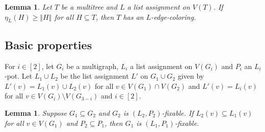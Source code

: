 \documentclass[12pt]{article}
\theoremstyle{plain}
\newtheorem{lem}[thm]{Lemma}
\theoremstyle{definition}
\theoremstyle{remark}
\newcommand{\size}[1]{\left\Vert#1\right\Vert}
\newcommand{\irange}[1]{\left[#1\right]}
\begin{document}
\begin{lem}\label{MultiTreeHall}
Let $T$ be a multitree and $L$ a list assignment on $V(T)$.  If $\eta_L(H) \ge \size{H}$ for all $H \subseteq T$, then $T$ has an $L$-edge-coloring.
\end{lem}

\subsection{Basic properties}
For $i \in \irange{2}$, let $G_i$ be a multigraph, $L_i$ a list assignment on $V(G_i)$ and $P_i$ an $L_i$-pot.  Let $L_1 \cup L_2$ be the list assignment $L'$ on $G_1 \cup G_2$ given by $L'(v) = L_1(v) \cup L_2(v)$ for all $v \in V(G_1) \cap V(G_2)$ and $L'(v) = L_i(v)$ for all $v \in V(G_i) \setminus V(G_{3-i})$ and $i \in \irange{2}$.

\begin{lem}
Suppose $G_1 \subseteq G_2$ and $G_2$ is $(L_2, P_2)$-fixable.  If $L_2(v) \subseteq L_1(v)$ for all $v \in V(G_1)$ and $P_2 \subseteq P_1$, then $G_1$ is $(L_1, P_1)$-fixable.
\end{lem}
\end{document}

